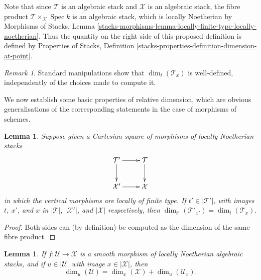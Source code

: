 \documentclass{stacks-project}
\theoremstyle{plain}
\newtheorem{lemma}[subsection]{Lemma}
\theoremstyle{definition}
\theoremstyle{remark}
\newtheorem{remark}[subsection]{Remark}
\numberwithin{equation}{subsection}
\def\Spec{\mathop{\mathrm{Spec}}}
\begin{document}
\noindent
Note that since $\mathcal{T}$ is an algebraic stack and $\mathcal{X}$ is an
algebraic stack, the fibre product $\mathcal{T}\times_{\mathcal{X}} \Spec k$
is an algebraic stack, which is locally Noetherian by
Morphisms of Stacks, Lemma
\ref{stacks-morphisms-lemma-locally-finite-type-locally-noetherian}.
Thus the quantity on the right side of this proposed definition
is defined by Properties of Stacks,
Definition \ref{stacks-properties-definition-dimension-at-point}.

\begin{remark}
\label{remark-dimension-tangent-space-well-defined}
Standard manipulations show that $\dim_t(\mathcal{T}_x)$ is well-defined,
independently of the choices made to compute it.
\end{remark}

\noindent
We now establish some basic properties of relative dimension, which
are obvious generalisations of the corresponding statements in the
case of morphisms of schemes.

\begin{lemma}
\label{lemma-base-change-invariance-of-relative-dimension}
Suppose given
a Cartesian square of morphisms of locally Noetherian stacks
$$
\xymatrix{
\mathcal{T}' \ar[d]\ar[r] & \mathcal{T} \ar[d] \\
\mathcal{X}' \ar[r] & \mathcal{X}
}
$$
in which the vertical morphisms are locally of finite type.
If $t' \in |\mathcal{T}'|$,
with images $t$, $x'$, and $x$ in $|\mathcal{T}|$, $|\mathcal{X}'|$, and
$|\mathcal{X}|$
respectively, then $\dim_{t'}(\mathcal{T}'_{x'}) = \dim_{t}(\mathcal{T}_x).$
\end{lemma}

\begin{proof}
Both sides can (by definition) be computed as the
dimension of the same fibre product.
\end{proof}

\begin{lemma}
\label{lemma-behaviour-of-dimensions-wrt-smooth-morphisms-stacky}
If $f: \mathcal{U} \to \mathcal{X}$ is a smooth morphism of locally Noetherian
algebraic stacks, and
if $u \in |\mathcal{U}|$ with image $x \in |\mathcal{X}|$,
then
$$
\dim_u (\mathcal{U}) = \dim_x(\mathcal{X}) + \dim_{u} (\mathcal{U}_x).
$$
\end{lemma}
\end{document}
